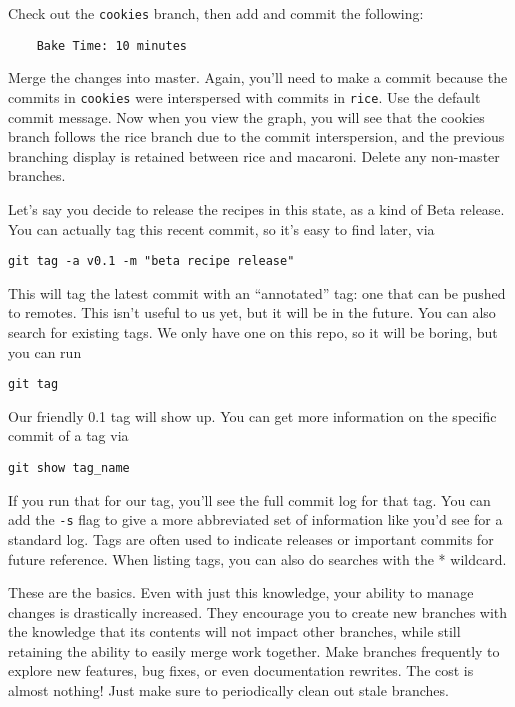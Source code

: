 \par{
Check out the \verb+cookies+ branch, then add and commit the following:
}

\begin{verbatim}
    Bake Time: 10 minutes
\end{verbatim}

\par{
Merge the changes into master. Again, you'll need to make a commit because the
commits in \verb+cookies+ were interspersed with commits in \verb+rice+. Use
the default commit message. Now when you view the graph, you will see that the
cookies branch follows the rice branch due to the commit interspersion, and
the previous branching display is retained between rice and macaroni. Delete
any non-master branches.
}

\par{
Let's say you decide to release the recipes in this state, as a kind of Beta
release. You can actually tag this recent commit, so it's easy to find later,
via
}

\begin{verbatim}
git tag -a v0.1 -m "beta recipe release"
\end{verbatim}

\par{
This will tag the latest commit with an ``annotated'' tag: one that can be
pushed to remotes. This isn't useful to us yet, but it will be in the future.
You can also search for existing tags. We only have one on this repo, so it
will be boring, but you can run
}

\begin{verbatim}
git tag
\end{verbatim}

\par{
Our friendly 0.1 tag will show up. You can get more information on the
specific commit of a tag via
}

\begin{verbatim}
git show tag_name
\end{verbatim}

\par{
If you run that for our tag, you'll see the full commit log for that tag. You
can add the \verb+-s+ flag to give a more abbreviated set of information like
you'd see for a standard log. Tags are often used to indicate releases or
important commits for future reference. When listing tags, you can also do
searches with the * wildcard.
}

\par{
These are the basics. Even with just this knowledge, your ability to manage
changes is drastically increased. They encourage you to create new branches
with the knowledge that its contents will not impact other branches, while
still retaining the ability to easily merge work together. Make branches
frequently to explore new features, bug fixes, or even documentation rewrites.
The cost is almost nothing! Just make sure to periodically clean out stale
branches. 
}

